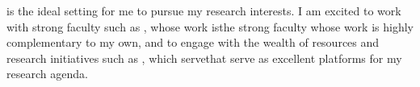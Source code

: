 %   
 \xmakefirstuc{\school} is the ideal setting for me to pursue my research interests. I am excited to work with \ifdefined\fitfaculty strong faculty such as \fitfaculty, whose work is\else the strong faculty whose work is\fi{} highly complementary to my own, and to engage with the wealth of resources and research initiatives \ifdefined\fitcenters such as \fitcenters, which serve\else that serve\fi{} as excellent platforms for my research agenda.
